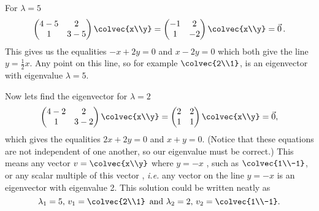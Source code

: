 {For $\lambda= 5$
\[
\begin{pmatrix}
4-5 & 2\\
1 & 3-5 \\ 
\end{pmatrix} \colvec{x\\y} =
\begin{pmatrix}
-1 & 2\\
1 & -2 \\ 
\end{pmatrix} \colvec{x\\y}
= \vec 0 \, .
\]
This gives us the equalities $-x +2y = 0$ and $x -2y = 0$ which both give the line $ y = \frac{1}{2}x$. Any point on this line, so for example $\colvec{2\\1}$, is an eigenvector with eigenvalue $\lambda = 5$.

Now lets find the eigenvector for $\lambda = 2$
\[
\begin{pmatrix}
4-2 & 2\\
1 & 3-2 \\ 
\end{pmatrix} \colvec{x\\y} =
\begin{pmatrix}
2 & 2\\
1 & 1 \\ 
\end{pmatrix} \colvec{x\\y}
= \vec 0 ,
\]
which gives the equalities $2x+2y = 0$ and $x+y = 0$. 
(Notice that these equations are not independent of one another, so our eigenvalue must be correct.)
This means any vector $v =  \colvec{x\\y}$ where $y = -x$ , such as $\colvec{1\\-1}$, or any scalar multiple of this vector , {\itshape i.e.} any vector on the line $y = -x$ is an eigenvector with eigenvalue 2. This solution could be written neatly as
 \[
\lambda_1 = 5, \, v_1= \colvec{2\\1} \, \text{ and } \lambda_2 = 2, \, v_2=\colvec{1\\-1}.
\]
} %


